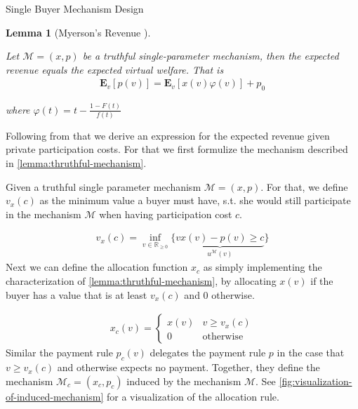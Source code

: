 \documentclass[11pt,a4paper]{article}
\newtheorem{lemma}[theorem]{Lemma}
\newcommand{\RR}{\ensuremath{\mathbb{R}}}
\newcommand{\1}[1]{\mbox{\rm\bf 1}_{#1}}
\begin{document}
\begin{section}{Single Buyer Mechanism Design}
 \begin{lemma}[Myerson's Revenue \cite{myerson}]
     \label{lemma:myerson-revenue}

     Let $\mathcal{M}=(x,p)$ be a truthful single-parameter mechanism, then the expected revenue equals the expected virtual welfare. That is
     \begin{align*}
         \mathbf{E}_v\left[p(v)\right]
         = \mathbf{E}_v\left[x(v)\varphi(v)\right] + p_0
     \end{align*}

     where $\varphi(t) = t - \frac{1 - F(t)}{f(t)}$
 \end{lemma}

 Following from that we derive an expression for the expected revenue given private participation costs.
 For that we first formulize the mechanism described in \autoref{lemma:thruthful-mechanism}.

 Given a truthful single parameter mechanism $\mathcal{M}=(x,p)$.
 For that, we define $v_x(c)$ as the minimum value a buyer must have, s.t. she would still participate in the mechanism $\mathcal{M}$ when having participation cost $c$.

 \begin{align*}
     v_x(c) = \inf_{v \in \RR_{\geq 0}} \{\underbrace{vx(v) - p(v) \geq c}_{u^\mathcal{M}(v)}\}
 \end{align*}
 Next we can define the allocation function $x_c$ as simply implementing the characterization of \autoref{lemma:thruthful-mechanism},
 by allocating $x(v)$ if the buyer has a value that is at least $v_x(c)$ and $0$ otherwise.

 \begin{align*}
     x_c(v) = \begin{cases}
                  x(v) & v \geq v_x(c)    \\
                  0    & \text{otherwise}
              \end{cases}
 \end{align*}
 Similar the payment rule $p_c(v)$ delegates the payment rule $p$ in the case that $v \geq v_x(c)$ and otherwise expects no payment.
 Together, they define the mechanism $\mathcal{M}_c = (x_c, p_c)$ induced by the mechanism $\mathcal{M}$.
 See \autoref{fig:visualization-of-induced-mechanism} for a visualization of the allocation rule.

 \begin{figure}[htp!]
     \centering

     \begin{subfigure}{.4\textwidth}
         \centering
\end{subfigure}
\end{figure}
\end{section}
\end{document}
